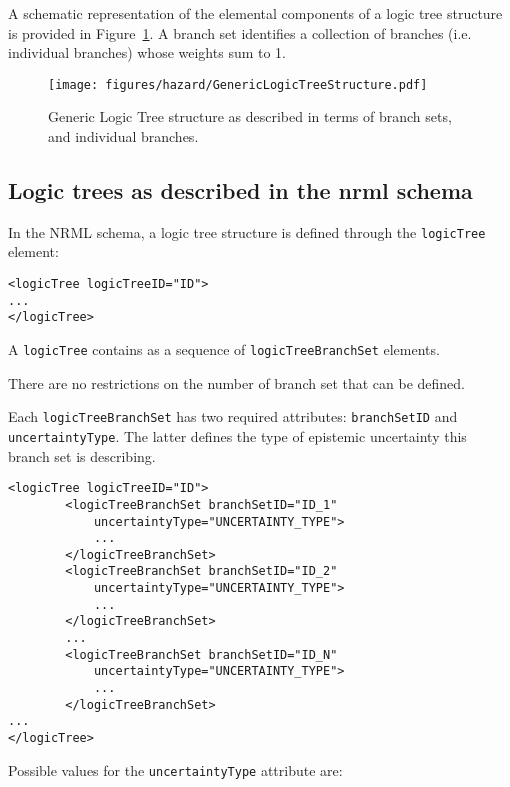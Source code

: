 A schematic representation of the elemental components of a logic tree
structure is provided in Figure~\ref{glts}.
A branch set identifies a collection of
branches (i.e. individual branches)  whose weights sum to 1.

\begin{figure}[!ht]
\centering
\texttt{[image: figures/hazard/GenericLogicTreeStructure.pdf]}
\caption{Generic Logic Tree structure as described in terms of branch sets,
and individual branches.}
\label{glts}
\end{figure}

\subsection{Logic trees as described in the nrml schema}

In the NRML schema, a logic tree structure is defined through the
\Verb+logicTree+ element:

\begin{verbatim}
<logicTree logicTreeID="ID">
...
</logicTree>
\end{verbatim}

A \Verb+logicTree+ contains as a sequence of \Verb+logicTreeBranchSet+ elements.

There are no restrictions on the number of branch set that can be defined.

Each \Verb+logicTreeBranchSet+
has two required attributes: \Verb+branchSetID+ and
\Verb+uncertaintyType+. The latter defines the type of epistemic uncertainty this branch set is describing.

\begin{verbatim}
<logicTree logicTreeID="ID">
		<logicTreeBranchSet branchSetID="ID_1"
			uncertaintyType="UNCERTAINTY_TYPE">
			...
		</logicTreeBranchSet>
		<logicTreeBranchSet branchSetID="ID_2"
			uncertaintyType="UNCERTAINTY_TYPE">
			...
		</logicTreeBranchSet>
		...
		<logicTreeBranchSet branchSetID="ID_N"
			uncertaintyType="UNCERTAINTY_TYPE">
			...
		</logicTreeBranchSet>
...
</logicTree>
\end{verbatim}

Possible values for the \Verb+uncertaintyType+ attribute are:

